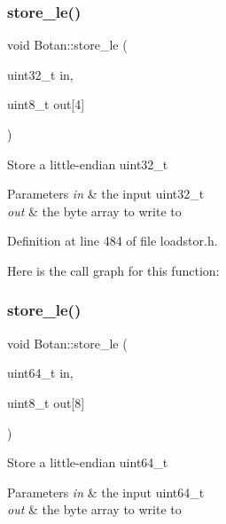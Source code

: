 \subsubsection{\texorpdfstring{store\+\_\+le()}{store\_le()}\hspace{0.1cm}{\footnotesize\ttfamily [2/6]}}
{\footnotesize\ttfamily void Botan\+::store\+\_\+le (\begin{DoxyParamCaption}\item[{uint32\+\_\+t}]{in,  }\item[{uint8\+\_\+t}]{out\mbox{[}4\mbox{]} }\end{DoxyParamCaption})\hspace{0.3cm}{\ttfamily [inline]}}

Store a little-\/endian uint32\+\_\+t 
\begin{DoxyParams}{Parameters}
{\em in} & the input uint32\+\_\+t \\
\hline
{\em out} & the byte array to write to \\
\hline
\end{DoxyParams}


Definition at line 484 of file loadstor.\+h.

Here is the call graph for this function\+:
\mbox{\label{namespace_botan_ac123595229ef6588f851540b9b774800}} 
\subsubsection{\texorpdfstring{store\+\_\+le()}{store\_le()}\hspace{0.1cm}{\footnotesize\ttfamily [3/6]}}
{\footnotesize\ttfamily void Botan\+::store\+\_\+le (\begin{DoxyParamCaption}\item[{uint64\+\_\+t}]{in,  }\item[{uint8\+\_\+t}]{out\mbox{[}8\mbox{]} }\end{DoxyParamCaption})\hspace{0.3cm}{\ttfamily [inline]}}

Store a little-\/endian uint64\+\_\+t 
\begin{DoxyParams}{Parameters}
{\em in} & the input uint64\+\_\+t \\
\hline
{\em out} & the byte array to write to \\
\hline
\end{DoxyParams}


